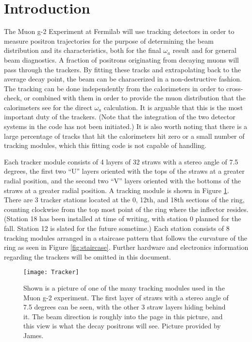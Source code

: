 \section{Introduction}

  The Muon g-2 Experiment at Fermilab will use tracking detectors in order to measure positron trajectories for the purpose of determining the beam distribution and its characteristics, both for the final $\omega_{a}$ result and for general beam diagnostics. A fraction of positrons originating from decaying muons will pass through the trackers. By fitting these tracks and extrapolating back to the average decay point, the beam can be characerized in a non-destructive fashion. The tracking can be done independently from the calorimeters in order to cross-check, or combined with them in order to provide the muon distribution that the calorimeters see for the direct $\omega_{a}$ calculation. It is arguable that this is the most important duty of the trackers. (Note that the integration of the two detector systems in the code has not been initiated.) It is also worth noting that there is a large percentage of tracks that hit the calorimeters hit zero or a small number of tracking modules, which this fitting code is not capable of handling.

  Each tracker module consists of 4 layers of 32 straws with a stereo angle of 7.5 degrees, the first two ``U'' layers oriented with the tops of the straws at a greater radial position, and the second two ``V'' layers oriented with the bottoms of the straws at a greater radial position. A tracking module is shown in Figure \ref{fig:tracker}. There are 3 tracker stations located at the 0, 12th, and 18th sections of the ring, counting clockwise from the top most point of the ring where the inflector resides. (Station 18 has been installed at time of writing, with station 0 planned for the fall. Station 12 is slated for the future sometime.) Each station consists of 8 tracking modules arranged in a staircase pattern that follows the curvature of the ring as seen in Figure \ref{fig:staircase}. Further hardware and electronics information regarding the trackers will be omitted in this document.

\begin{figure}[]
\caption{Shown is a picture of one of the many tracking modules used in the Muon g-2 experiment. The first layer of straws with a stereo angle of 7.5 degrees can be seen, with the other 3 straw layers hiding behind it. The beam direction is roughly into the page in this picture, and this view is what the decay positrons will see. Picture provided by James.}
\centering
\texttt{[image: Tracker]}
\label{fig:tracker}
\end{figure}

